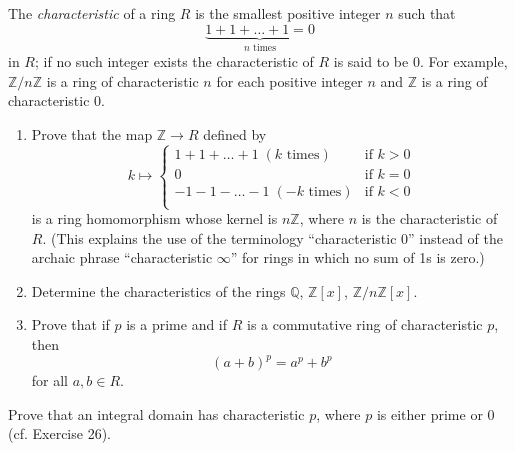 \documentclass[12pt,letterpaper]{hmcpset}
\newcommand{\Zz}{\mathbb{Z}}
\newcommand{\Qq}{\mathbb{Q}}
\begin{document}
\begin{problem}[7.3.26]
The \emph{characteristic}
of a ring $R$ is the smallest
positive integer $n$ such that
\begin{equation*}
    \underbrace{
        1+1+\ldots+1=0
    }_{n \text{ times}}
\end{equation*}
in $R$; if no such integer exists
the characteristic of $R$ is said
to be $0$. For example, $\Zz/n\Zz$
is a ring of characteristic $n$
for each positive integer $n$ and
$\Zz$ is a ring of characteristic
$0$.
\begin{enumerate}
    \item
        Prove that the map
        $\Zz \to R$ defined by
        \begin{equation*}
            k \mapsto
            \begin{cases}
                1 + 1 + \ldots + 1  \; (k \text{ times})
                        & \text{if } k>0 \\
                0
                        & \text{if } k=0 \\
                -1 - 1 - \ldots - 1  \; (-k \text{ times})
                        & \text{if } k<0 \\
            \end{cases}
        \end{equation*}
        is a ring homomorphism whose kernel is
        $n\Zz$, where $n$ is the characteristic
        of $R$. (This explains the use of the
        terminology ``characteristic 0'' instead
        of the archaic phrase
        ``characteristic $\infty$'' for rings
        in which no sum of 1s is zero.)
    \item
        Determine the characteristics
        of the rings $\Qq$,
        $\Zz[x]$, $\Zz/n\Zz[x]$.
    \item
        Prove that if $p$ is a prime
        and if $R$ is a commutative
        ring of characteristic $p$,
        then
        \begin{equation*}
            (a+b)^p = a^p + b^p
        \end{equation*}
        for all $a,b \in R$.
\end{enumerate}
\end{problem}
\begin{solution}
\vfill
\end{solution}
\newpage

\begin{problem}[7.3.28]
	Prove that an integral domain has characteristic $p$, where $p$ is either prime or 0 (cf. Exercise 26).
\end{problem}
\begin{solution}
	\vfill
\end{solution}
\newpage
\end{document}
